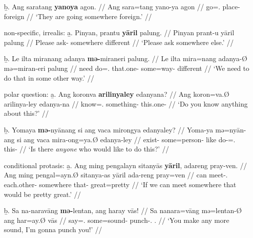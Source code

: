 	\b{b.} \begingl
		\gla Ang saratang \textbf{yanoya} agon. //
		\glb Ang sara=tang yano-ya agon //
		\glc \AgtT{} go=\TplM{}.\Aarg{} place-\Loc{} foreign //
		\glft `They are going somewhere foreign.' //
		\endgl
	\endsubsub
	
\a non-specific, irrealis:\vspace{.5em} %
	\beginsubsub
	\b{a.} \begingl
		\gla Pinyan, prantu \textbf{yāril} palung. //
		\glb Pinyan prant-u yāril palung //
		\glc Please ask-\Imp{} somewhere different //
		\glft `Please ask somewhere else.' //
		\endgl\vspace{.5em}
		
	\b{b.} \begingl
		\gla Le ilta miranang adanya \textbf{mə-}miraneri 
			palung. //
		\glb Le ilta mira=nang adanya-Ø mə=miran-eri palung //
		\glc \PatTI{} need do=\Fsg{}.\Aarg{} that.one-\Top{} 
			some=way-\Ins{} different //
		\glft `We need to do that in some other way.' //
		\endgl
	\endsubsub
	
\a polar question:\vspace{.5em} %
	\beginsubsub
	\b{a.} \begingl
		\gla Ang koronva \textbf{arilinyaley} edanyana? //
		\glb Ang koron=va.Ø arilinya-ley edanya-na //
		\glc \AgtT{} know=\Ssg{}.\Top{} something-\PargI{} 
			this.one-\Gen{} //
		\glft `Do you know anything about this?' //
		\endgl\vspace{.5em}
		
	\b{b.} \begingl
		\gla Yomaya \textbf{mə-}nyānang si ang vaca mirongya 
			edanyaley? //
		\glb Yoma-ya mə=nyān-ang si ang vaca mira-ong=ya.Ø
			edanya-ley //
		\glc exist-\TsgM{} some=person-\Aarg{} \Rel{} \AgtT{} 
			like do-\Irr{}=\TsgM{}.\Top{} this-\PargI{} //
		\glft `Is there \emph{anyone} who would like to do this?' //
		\endgl
	\endsubsub

\a conditional protasis:\vspace{.5em} %
	\beginsubsub
	\b{a.} \begingl
		\gla Ang ming pengalayn sitanyās \textbf{yāril}, adareng 
			pray-ven. //
		\glb Ang ming pengal=ayn.Ø sitanya-as yāril ada-reng 
			pray=ven //
		\glc \AgtT{} can meet-\Fpl{}.\Top{} each.other-\Parg{} 
			somewhere that-\AargI{} great=pretty //
		\glft `If we can meet somewhere that would be pretty great.' //
		\endgl\vspace{.5em}
		
	\b{b.} \begingl
		\gla Sa na-naravāng \textbf{mə-}lentan, ang haray vās! //
		\glb Sa na\til{}nara=vāng mə=lentan-Ø ang har=ay.Ø vās //
		\glc \PatT{} \Iter{}\til{}say=\Ssg{}.\Aarg{} some=sound-\Top{} 
			\AgtT{} punch-\Fsg{}.\Top{} \Ssg{}.\Parg{} //
		\glft `You make any more sound, I'm gonna punch you!' //
		\endgl
	\endsubsub
	
